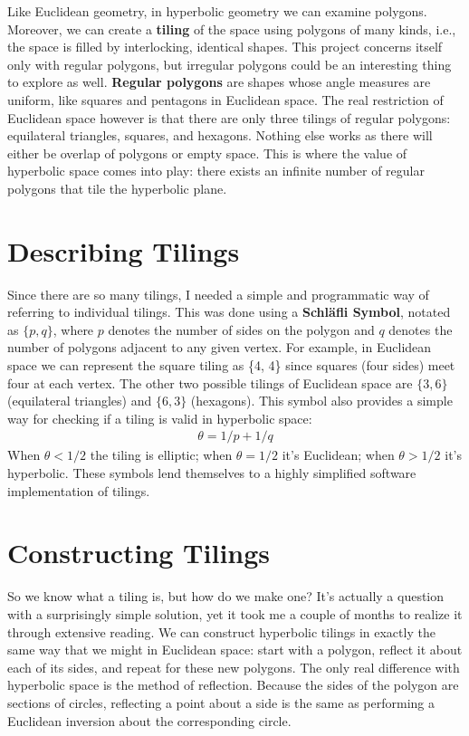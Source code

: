 \documentclass[letterpaper,12pt]{article}
\begin{document}
Like Euclidean geometry, in hyperbolic geometry we can examine polygons. Moreover, we can create a \textbf{tiling} of the space using polygons of many kinds, i.e., the space is filled by interlocking, identical shapes. This project concerns itself only with regular polygons, but irregular polygons could be an interesting thing to explore as well. \textbf{Regular polygons} are shapes whose angle measures are uniform, like squares and pentagons in Euclidean space. The real restriction of Euclidean space however is that there are only three tilings of regular polygons: equilateral triangles, squares, and hexagons. Nothing else works as there will either be overlap of polygons or empty space. This is where the value of hyperbolic space comes into play: there exists an infinite number of regular polygons that tile the hyperbolic plane.

\section*{Describing Tilings}

Since there are so many tilings, I needed a simple and programmatic way of referring to individual tilings. This was done using a \textbf{Schl{\"a}fli Symbol}, notated as $\{p, q\}$, where $p$ denotes the number of sides on the polygon and $q$ denotes the number of polygons adjacent to any given vertex. For example, in Euclidean space we can represent the square tiling as \{4, 4\} since squares (four sides) meet four at each vertex. The other two possible tilings of Euclidean space are $\{3, 6\}$ (equilateral triangles) and $\{6, 3\}$ (hexagons). This symbol also provides a simple way for checking if a tiling is valid in hyperbolic space:
\begin{gather*}
\theta=1/p + 1/q
\end{gather*}
When $\theta<1/2$ the tiling is elliptic; when $\theta=1/2$ it's Euclidean; when $\theta>1/2$ it's hyperbolic.  These symbols lend themselves to a highly simplified software implementation of tilings.

\section*{Constructing Tilings}

So we know what a tiling is, but how do we make one? It's actually a question with a surprisingly simple solution, yet it took me a couple of months to realize it through extensive reading. We can construct hyperbolic tilings in exactly the same way that we might in Euclidean space: start with a polygon, reflect it about each of its sides, and repeat for these new polygons. The only real difference with hyperbolic space is the method of reflection. Because the sides of the polygon are sections of circles, reflecting a point about a side is the same as performing a Euclidean inversion about the corresponding circle.
\end{document}
